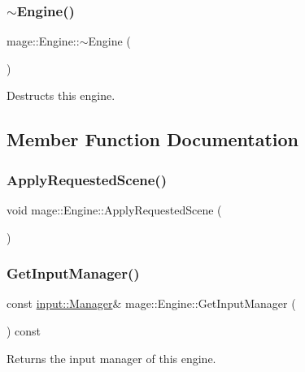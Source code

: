 \subsubsection{\texorpdfstring{$\sim$\+Engine()}{~Engine()}}
{\footnotesize\ttfamily mage\+::\+Engine\+::$\sim$\+Engine (\begin{DoxyParamCaption}{ }\end{DoxyParamCaption})}

Destructs this engine. 

\subsection{Member Function Documentation}
\mbox{\label{classmage_1_1_engine_a4fcb9760814dfa59c9fff34f1c82357b}} 
\subsubsection{\texorpdfstring{Apply\+Requested\+Scene()}{ApplyRequestedScene()}}
{\footnotesize\ttfamily void mage\+::\+Engine\+::\+Apply\+Requested\+Scene (\begin{DoxyParamCaption}{ }\end{DoxyParamCaption})\hspace{0.3cm}{\ttfamily [private]}}

\mbox{\label{classmage_1_1_engine_ae5b542540511190eb6d284bf3e6ab54c}} 
\subsubsection{\texorpdfstring{Get\+Input\+Manager()}{GetInputManager()}}
{\footnotesize\ttfamily const \mbox{\hyperlink{classmage_1_1input_1_1_manager}{input\+::\+Manager}}\& mage\+::\+Engine\+::\+Get\+Input\+Manager (\begin{DoxyParamCaption}{ }\end{DoxyParamCaption}) const\hspace{0.3cm}{\ttfamily [noexcept]}}

Returns the input manager of this engine.

